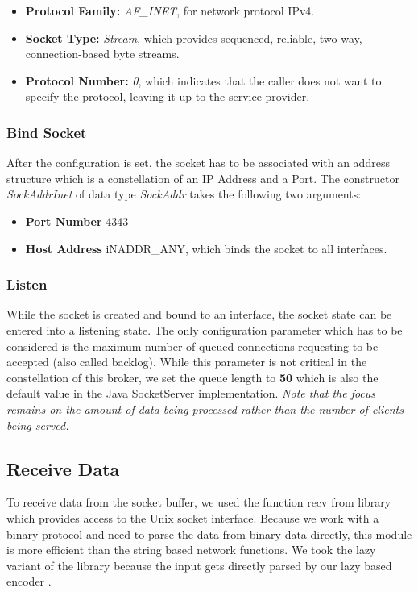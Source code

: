 \begin{itemize}
    \item {\bf Protocol Family:} \textit{AF\_INET}, for network protocol IPv4.
    \item {\bf Socket Type:} \textit{Stream}, which provides sequenced, reliable, two-way, connection-based byte streams.
    \item {\bf Protocol Number:} \textit{0}, which indicates that the caller does not want to specify the protocol, leaving it up to the service provider.
\end{itemize}


\subsubsection{Bind Socket}

After the configuration is set, the socket has to be associated with an address
structure which is a constellation of an IP Address and a Port. The constructor
\textit{SockAddrInet} of data type \textit{SockAddr} takes the following
two arguments:

\begin{itemize}
    \item {\bf Port Number} 4343
    \item {\bf Host Address} iNADDR\_ANY, which binds the socket to all interfaces.
\end{itemize}


\subsubsection{Listen}

While the socket is created and bound to an interface, the socket state can be
entered into a listening state. The only configuration parameter which has to be
considered is the maximum number of queued connections requesting to
be accepted (also called backlog). While this parameter is not critical in the
constellation of this broker, we set the queue length to \textbf{50} which is
also the default value in the Java SocketServer implementation. \textit{Note
that the focus remains on the amount of data being processed rather than the
number of clients being served.}

\subsection{Receive Data}
\label{sec:impl-broker-socket-receive}
To receive data from the socket buffer, we used the function recv from
library which provides access to the Unix socket interface. Because we work
with a binary protocol and need to parse the data from binary data directly,
this module is more efficient than the string based network functions. We
took the lazy variant of the library because the input gets directly parsed by
our lazy based encoder .


